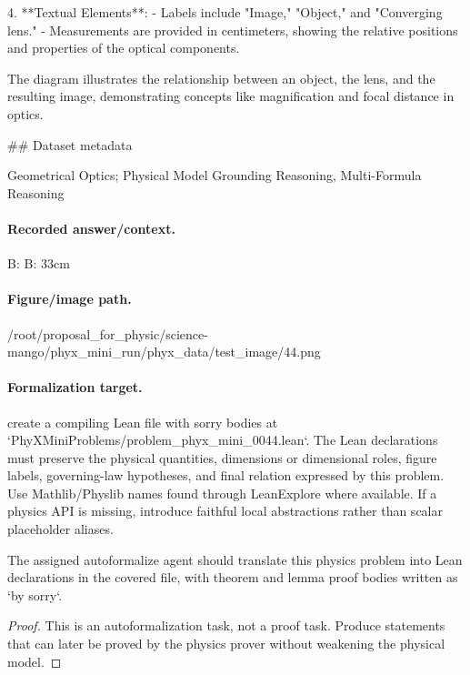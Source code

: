 4. **Textual Elements**:
   - Labels include "Image," "Object," and "Converging lens."
   - Measurements are provided in centimeters, showing the relative positions and properties of the optical components.

The diagram illustrates the relationship between an object, the lens, and the resulting image, demonstrating concepts like magnification and focal distance in optics.

\#\# Dataset metadata

Geometrical Optics; Physical Model Grounding Reasoning, Multi-Formula Reasoning

\paragraph{Recorded answer/context.}
B: B: 33cm

\paragraph{Figure/image path.}
/root/proposal\_for\_physic/science-mango/phyx\_mini\_run/phyx\_data/test\_image/44.png

\paragraph{Formalization target.}
create a compiling Lean file with sorry bodies at `PhyXMiniProblems/problem\_phyx\_mini\_0044.lean`. The Lean declarations must preserve the physical quantities, dimensions or dimensional roles, figure labels, governing-law hypotheses, and final relation expressed by this problem.
Use Mathlib/Physlib names found through LeanExplore where available. If a physics API is missing, introduce faithful local abstractions rather than scalar placeholder aliases.

\begin{theorem}
\label{thm:physics:phyx_mini_0044:target}
The assigned autoformalize agent should translate this physics problem into Lean declarations in the covered file, with theorem and lemma proof bodies written as `by sorry`.
\end{theorem}
\begin{proof}
This is an autoformalization task, not a proof task. Produce statements that can later be proved by the physics prover without weakening the physical model.
\end{proof}

